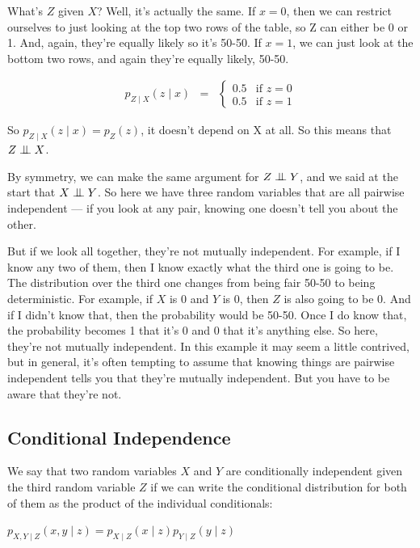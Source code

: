 \documentclass[6008notes.tex]{subfiles}
\begin{document}
What's $Z$ given $X$? Well, it's actually the same. If $x=0$, then we can restrict ourselves to just looking at the top two rows of the table, so Z can either be 0 or 1. And, again, they're equally likely so it's 50-50. If $x=1$, we can just look at the bottom two rows, and again they're equally likely, 50-50. 

\begin{eqnarray*}
p_{Z \mid X}(z \mid x)
&=&
\begin{cases}
  0.5 & \text{if }z=0 \\
  0.5 & \text{if }z=1
\end{cases}
\end{eqnarray*}

So $p_{Z \mid X}(z \mid x) = p_Z(z)$, it doesn't depend on X at all. So this means that $Z \bigCI X$.

By symmetry, we can make the same argument for $Z \bigCI Y$, and we said at the start that $X \bigCI Y$. So here we have three random variables that are all pairwise independent --- if you look at any pair, knowing one doesn't tell you about the other. 

But if we look all together, they're not mutually independent. For example, if I know any two of them, then I know exactly what the third one is going to be. The distribution over the third one changes from being fair 50-50 to being deterministic. For example, if $X$ is 0 and $Y$ is 0, then $Z$ is also going to be 0. And if I didn't know that, then the probability would be 50-50. Once I do know that, the probability becomes 1 that it's 0 and 0 that it's anything else. So here, they're not mutually independent. In this example it may seem a little contrived, but in general, it's often tempting to assume that knowing things are pairwise independent tells you that they're mutually independent. But you have to be aware that they're not.

\subsection{Conditional Independence}

We say that two random variables $X$ and $Y$ are conditionally independent given the third random variable $Z$ if we can write the conditional distribution for both of them as the product of the individual conditionals:

{\centering$p_{X,Y \mid Z} (x,y \mid z) = p_{X \mid Z} (x \mid z) p_{Y \mid Z} (y \mid z) $ \par}
\end{document}
